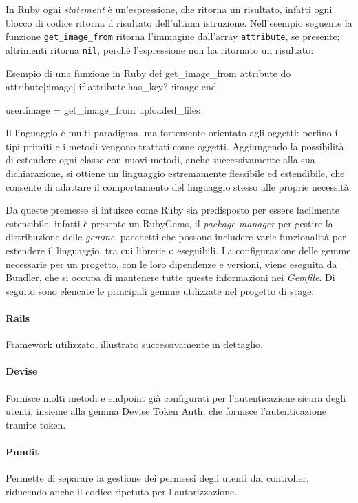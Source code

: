 \noindent In Ruby ogni \emph{statement} è un'espressione, che ritorna un risultato, infatti ogni blocco di codice ritorna il risultato dell'ultima istruzione. Nell'esempio seguente la funzione \verb|get_image_from| ritorna l'immagine dall'array \verb|attribute|, se presente; altrimenti ritorna \verb|nil|, perché l'espressione non ha ritornato un risultato:
\begin{code}{Esempio di una funzione in Ruby}
	def get_image_from attribute do
		attribute[:image] if attribute.has_key? :image
	end

	user.image = get_image_from uploaded_files
\end{code}

\noindent Il linguaggio è multi-paradigma, ma fortemente orientato agli oggetti: perfino i tipi primiti e i metodi vengono trattati come oggetti. Aggiungendo la possibilità di estendere ogni classe con nuovi metodi, anche successivamente alla sua dichiarazione, si ottiene un linguaggio estremamente flessibile ed estendibile, che consente di adattare il comportamento del linguaggio stesso alle proprie necessità.

Da queste premesse si intuisce come Ruby sia predisposto per essere facilmente estensibile, infatti è presente un RubyGems, il \emph{package manager} per gestire la distribuzione delle \emph{gemme}, pacchetti che possono includere varie funzionalità per estendere il linguaggio, tra cui librerie o eseguibili. La configurazione delle gemme necessarie per un progetto, con le loro dipendenze e versioni, viene eseguita da Bundler, che si occupa di mantenere tutte queste informazioni nei \emph{Gemfile}. Di seguito sono elencate le principali gemme utilizzate nel progetto di stage.
\paragraph{Rails} Framework utilizzato, illustrato successivamente in dettaglio.
\paragraph{Devise} Fornisce molti metodi e endpoint già configurati per l'autenticazione sicura degli utenti, insieme alla gemma Devise Token Auth, che fornisce l'autenticazione tramite token.
\paragraph{Pundit} Permette di separare la gestione dei permessi degli utenti dai controller, riducendo anche il codice ripetuto per l'autorizzazione.

